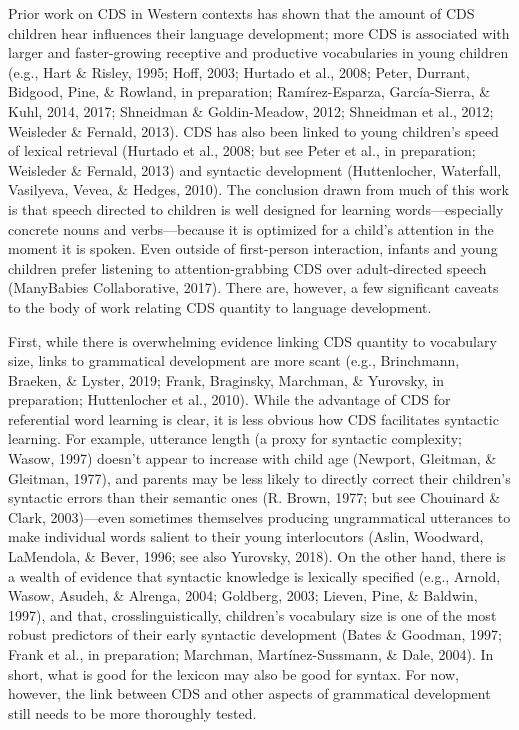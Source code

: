 \documentclass[floatsintext,man]{apa6}
\theoremstyle{definition}
\theoremstyle{definition}
\theoremstyle{definition}
\theoremstyle{remark}
\begin{document}
Prior work on CDS in Western contexts has shown that the amount of CDS
children hear influences their language development; more CDS is
associated with larger and faster-growing receptive and productive
vocabularies in young children (e.g., Hart \& Risley, 1995; Hoff, 2003;
Hurtado et al., 2008; Peter, Durrant, Bidgood, Pine, \& Rowland, in
preparation; Ramírez-Esparza, García-Sierra, \& Kuhl, 2014, 2017;
Shneidman \& Goldin-Meadow, 2012; Shneidman et al., 2012; Weisleder \&
Fernald, 2013). CDS has also been linked to young children's speed of
lexical retrieval (Hurtado et al., 2008; but see Peter et al., in
preparation; Weisleder \& Fernald, 2013) and syntactic development
(Huttenlocher, Waterfall, Vasilyeva, Vevea, \& Hedges, 2010). The
conclusion drawn from much of this work is that speech directed to
children is well designed for learning words---especially concrete nouns
and verbs---because it is optimized for a child's attention in the
moment it is spoken. Even outside of first-person interaction, infants
and young children prefer listening to attention-grabbing CDS over
adult-directed speech (ManyBabies Collaborative, 2017). There are,
however, a few significant caveats to the body of work relating CDS
quantity to language development.

First, while there is overwhelming evidence linking CDS quantity to
vocabulary size, links to grammatical development are more scant (e.g.,
Brinchmann, Braeken, \& Lyster, 2019; Frank, Braginsky, Marchman, \&
Yurovsky, in preparation; Huttenlocher et al., 2010). While the
advantage of CDS for referential word learning is clear, it is less
obvious how CDS facilitates syntactic learning. For example, utterance
length (a proxy for syntactic complexity; Wasow, 1997) doesn't appear to
increase with child age (Newport, Gleitman, \& Gleitman, 1977), and
parents may be less likely to directly correct their children's
syntactic errors than their semantic ones (R. Brown, 1977; but see
Chouinard \& Clark, 2003)---even sometimes themselves producing
ungrammatical utterances to make individual words salient to their young
interlocutors (Aslin, Woodward, LaMendola, \& Bever, 1996; see also
Yurovsky, 2018). On the other hand, there is a wealth of evidence that
syntactic knowledge is lexically specified (e.g., Arnold, Wasow, Asudeh,
\& Alrenga, 2004; Goldberg, 2003; Lieven, Pine, \& Baldwin, 1997), and
that, crosslinguistically, children's vocabulary size is one of the most
robust predictors of their early syntactic development (Bates \&
Goodman, 1997; Frank et al., in preparation; Marchman,
Martínez-Sussmann, \& Dale, 2004). In short, what is good for the
lexicon may also be good for syntax. For now, however, the link between
CDS and other aspects of grammatical development still needs to be more
thoroughly tested.
\end{document}
